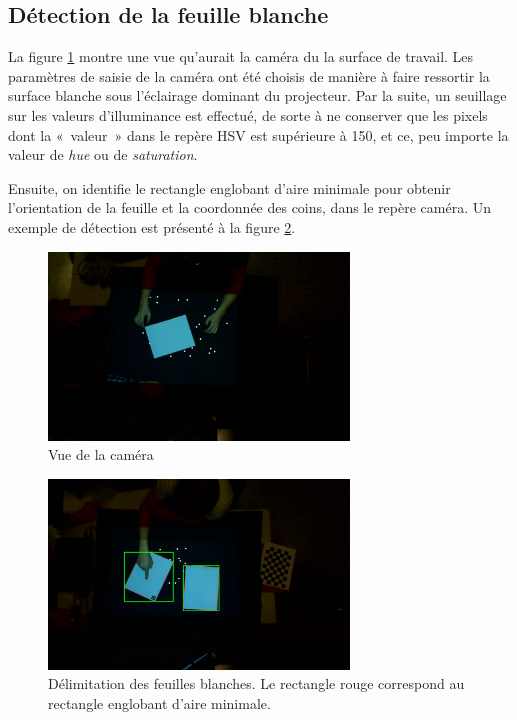 \documentclass[11pt]{report}
\begin{document}
\subsection{Détection de la feuille blanche}
La figure \ref{feuille_blanche} montre une vue qu'aurait la caméra du la surface
de travail. Les paramètres de saisie de la caméra ont été choisis de manière à
faire ressortir la surface blanche sous l'éclairage dominant du projecteur. Par
la suite, un seuillage sur les valeurs d'illuminance est effectué, de sorte à ne
conserver que les pixels dont la « valeur » dans le repère HSV est supérieure à
150, et ce, peu importe la valeur de \textit{hue} ou de \textit{saturation}.

Ensuite, on identifie le rectangle englobant d'aire minimale pour obtenir
l'orientation de la feuille et la coordonnée des coins, dans le repère caméra.
Un exemple de détection est présenté à la figure \ref{detection_feuille}.

\begin{figure}[h]
  \centering
  \includegraphics[width=8cm]{feuille-blanche.jpg}
  \caption{Vue de la caméra}
  \label{feuille_blanche}
\end{figure}

\begin{figure}[h]
  \centering
  \includegraphics[width=8cm]{localisation-feuille.png}
  \caption{Délimitation des feuilles blanches.
    Le rectangle rouge correspond au rectangle englobant d'aire minimale.}
  \label{detection_feuille}
\end{figure}
\end{document}
